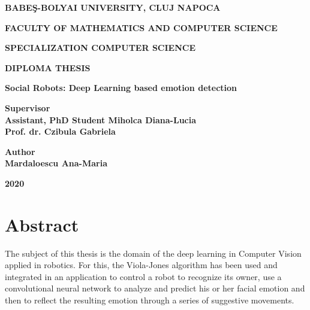 \documentclass[runningheads,a4paper,12pt]{report}
\begin{document}
\begin{titlepage}
\sloppy
\begin{center}
\Large \textbf{BABE\c S-BOLYAI UNIVERSITY, CLUJ NAPOCA}

\Large \textbf{FACULTY OF MATHEMATICS AND COMPUTER SCIENCE}

\Large \textbf{SPECIALIZATION COMPUTER SCIENCE}

\vspace{4cm}

\LARGE \textbf{DIPLOMA THESIS}

\vspace{0.3cm}

\LARGE \textbf {Social Robots: Deep Learning based emotion detection}

\end{center}

\vspace{3cm}

\begin{flushleft}
\LARGE{\textbf{Supervisor}}\\
\LARGE{\textbf{Assistant, PhD Student Miholca Diana-Lucia}}\\
\LARGE{\textbf{Prof. dr. Czibula Gabriela}}
\end{flushleft}

\vspace{0.5cm}

\begin{flushright}
\LARGE{\textbf{Author}}\\
\LARGE{\textbf{Mardaloescu Ana-Maria}}
\end{flushright}

\vspace{3cm}

\begin{center}
\LARGE{\textbf{2020}}
\end{center}

\newpage

\end{titlepage}


\tableofcontents

\newpage


\chapter*{Abstract}
The subject of this thesis is the domain of the deep learning in Computer Vision applied in robotics. For this, the Viola-Jones algorithm has been used and integrated in an application to control a robot to recognize its owner, use a convolutional neural network to analyze and predict his or her facial emotion and then to reflect the resulting emotion through a series of suggestive movements. 
\end{document}
